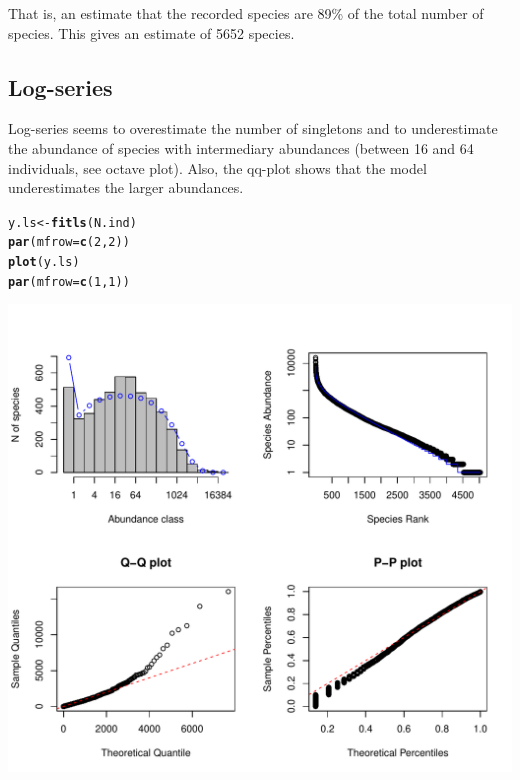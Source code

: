 \documentclass[12pt, A4]{article}\usepackage[]{graphicx}\usepackage[]{color}
\makeatletter
\def\maxwidth{ %
  \ifdim\Gin@nat@width>\linewidth
    \linewidth
  \else
    \Gin@nat@width
  \fi
}
\newcommand{\hlnum}[1]{\textcolor[rgb]{0.686,0.059,0.569}{#1}}%
\newcommand{\hlstd}[1]{\textcolor[rgb]{0.345,0.345,0.345}{#1}}%
\newcommand{\hlkwb}[1]{\textcolor[rgb]{0.69,0.353,0.396}{#1}}%
\newcommand{\hlkwc}[1]{\textcolor[rgb]{0.333,0.667,0.333}{#1}}%
\newcommand{\hlkwd}[1]{\textcolor[rgb]{0.737,0.353,0.396}{\textbf{#1}}}%
\newenvironment{kframe}{%
 \def\at@end@of@kframe{}%
 \ifinner\ifhmode%
  \def\at@end@of@kframe{\end{minipage}}%
  \begin{minipage}{\columnwidth}%
 \fi\fi%
 \def\FrameCommand##1{\hskip\@totalleftmargin \hskip-\fboxsep
 \colorbox{shadecolor}{##1}\hskip-\fboxsep
     \hskip-\linewidth \hskip-\@totalleftmargin \hskip\columnwidth}%
 \MakeFramed {\advance\hsize-\width
   \@totalleftmargin\z@ \linewidth\hsize
   \@setminipage}}%
 {\par\unskip\endMakeFramed%
 \at@end@of@kframe}
\newenvironment{knitrout}{}{} %
\makeatother
\begin{document}
That is, an estimate that the recorded species are 89\%
of the total number of species.
This gives an estimate of 5652 species.


\subsection*{Log-series}

Log-series seems to overestimate the number of singletons
and to underestimate the abundance of species with intermediary abundances
(between 16 and 64 individuals, see octave plot). Also, the qq-plot shows that
the model underestimates the larger abundances.

 
\begin{knitrout}
\color{fgcolor}\begin{kframe}
\begin{alltt}
\hlstd{y.ls} \hlkwb{<-} \hlkwd{fitls}\hlstd{(N.ind)}
\hlkwd{par}\hlstd{(}\hlkwc{mfrow}\hlstd{=}\hlkwd{c}\hlstd{(}\hlnum{2}\hlstd{,}\hlnum{2}\hlstd{))}
\hlkwd{plot}\hlstd{(y.ls)}
\hlkwd{par}\hlstd{(}\hlkwc{mfrow}\hlstd{=}\hlkwd{c}\hlstd{(}\hlnum{1}\hlstd{,}\hlnum{1}\hlstd{))}
\end{alltt}
\end{kframe}

{\centering \includegraphics[width=\maxwidth]{figure/fit_ls-1} 

}



\end{knitrout}
\end{document}
